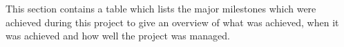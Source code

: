 This section contains a table which lists the major milestones which were
achieved during this project to give an overview of what was achieved, when it was
achieved and how well the project was managed.

